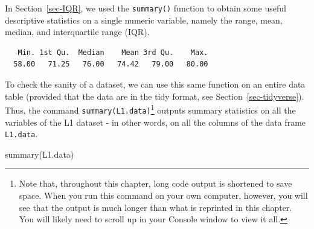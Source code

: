 \documentclass[
  letterpaper,
  DIV=11,
  numbers=noendperiod]{scrreprt}
\newenvironment{Shaded}{\begin{snugshade}}{\end{snugshade}}
\newcommand{\FunctionTok}[1]{\textcolor[rgb]{0.28,0.35,0.67}{#1}}
\newcommand{\NormalTok}[1]{\textcolor[rgb]{0.00,0.23,0.31}{#1}}
\newcommand{\SpecialCharTok}[1]{\textcolor[rgb]{0.37,0.37,0.37}{#1}}
\begin{document}
In Section~\ref{sec-IQR}, we used the \texttt{summary()} function to
obtain some useful descriptive statistics on a single numeric variable,
namely the range, mean, median, and interquartile range (IQR).

\begin{Shaded}
\end{Shaded}

\begin{verbatim}
   Min. 1st Qu.  Median    Mean 3rd Qu.    Max. 
  58.00   71.25   76.00   74.42   79.00   80.00 
\end{verbatim}

To check the sanity of a dataset, we can use this same function on an
entire data table (provided that the data are in the tidy format, see
Section~\ref{sec-tidyverse}). Thus, the command
\texttt{summary(L1.data)}\footnote{Note that, throughout this chapter,
  long code output is shortened to save space. When you run this command
  on your own computer, however, you will see that the output is much
  longer than what is reprinted in this chapter. You will likely need to
  scroll up in your Console window to view it all.} outputs summary
statistics on all the variables of the L1 dataset - in other words, on
all the columns of the data frame \texttt{L1.data}.

\begin{Shaded}
\begin{Highlighting}[]
\FunctionTok{summary}\NormalTok{(L1.data)}
\end{Highlighting}
\end{Shaded}
\end{document}
